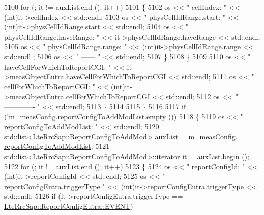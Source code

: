 \begin{DoxyCode}
5100                   \textcolor{keywordflow}{for} (; it != auxList.end (); it++)
5101                     \{
5102                       os << \textcolor{stringliteral}{"      cellIndex: "} <<  (int)it->cellIndex << std::endl;
5103                       os << \textcolor{stringliteral}{"      physCellIdRange.start: "} <<  (\textcolor{keywordtype}{int})it->physCellIdRange.start  << 
      std::endl;
5104                       os << \textcolor{stringliteral}{"      physCellIdRange.haveRange: "} <<  it->physCellIdRange.haveRange << 
      std::endl;
5105                       os << \textcolor{stringliteral}{"      physCellIdRange.range: "} <<  (int)it->physCellIdRange.range << std::endl
      ;
5106                       os << \textcolor{stringliteral}{"      ------ "} << std::endl;
5107                     \}
5108                 \}
5109 
5110               os << \textcolor{stringliteral}{"    haveCellForWhichToReportCGI: "} <<  it->measObjectEutra.haveCellForWhichToReportCGI
        << std::endl;
5111               os << \textcolor{stringliteral}{"    cellForWhichToReportCGI: "} <<  (int)it->measObjectEutra.cellForWhichToReportCGI  
      << std::endl;
5112               os << \textcolor{stringliteral}{"    ------------- "} << std::endl;
5113             \}
5114 
5115         \}
5116 
5117       \textcolor{keywordflow}{if} (!\hyperlink{classns3_1_1RrcConnectionReconfigurationHeader_a5fd4a46dd4c2fdefd5fdaa4d6f51a198}{m\_measConfig}.\hyperlink{structns3_1_1LteRrcSap_1_1MeasConfig_ac108843a06536367bc3ca19dbd1421da}{reportConfigToAddModList}.empty ())
5118         \{
5119           os << \textcolor{stringliteral}{"  reportConfigToAddModList: "} << std::endl;
5120           std::list<LteRrcSap::ReportConfigToAddMod> auxList = \hyperlink{classns3_1_1RrcConnectionReconfigurationHeader_a5fd4a46dd4c2fdefd5fdaa4d6f51a198}{m\_measConfig}.
      \hyperlink{structns3_1_1LteRrcSap_1_1MeasConfig_ac108843a06536367bc3ca19dbd1421da}{reportConfigToAddModList};
5121           std::list<LteRrcSap::ReportConfigToAddMod>::iterator it = auxList.begin ();
5122           \textcolor{keywordflow}{for} (; it != auxList.end (); it++)
5123             \{
5124               os << \textcolor{stringliteral}{"    reportConfigId: "} << (int)it->reportConfigId << std::endl;
5125               os << \textcolor{stringliteral}{"    reportConfigEutra.triggerType  "} <<  (\textcolor{keywordtype}{int})it->reportConfigEutra.triggerType << 
      std::endl;
5126               \textcolor{keywordflow}{if} (it->reportConfigEutra.triggerType == 
      \hyperlink{structns3_1_1LteRrcSap_1_1ReportConfigEutra_a457763ab0765f15b66c62f8177fa412ea492651ea4b8c0f484edb0c018e908fcf}{LteRrcSap::ReportConfigEutra::EVENT})

\end{DoxyCode}
